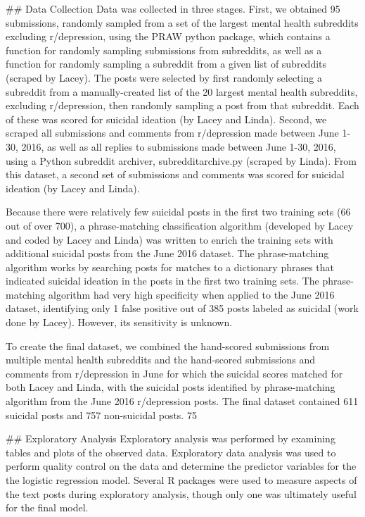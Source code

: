 ## Data Collection
Data was collected in three stages. First, we obtained 95 submissions, randomly sampled from a set of the largest mental health subreddits excluding r/depression, using the PRAW python package, which contains a function for randomly sampling submissions from subreddits, as well as a function for randomly sampling a subreddit from a given list of subreddits (scraped by Lacey). The posts were selected by first randomly selecting a subreddit from a manually-created list of the 20 largest mental health subreddits, excluding r/depression, then randomly sampling a post from that subreddit. Each of these was scored for suicidal ideation (by Lacey and Linda). Second, we scraped all submissions and comments from r/depression made between June 1-30, 2016, as well as all replies to submissions made between June 1-30, 2016, using a Python subreddit archiver, subredditarchive.py (scraped by Linda). From this dataset, a second set of submissions and comments was scored for suicidal ideation (by Lacey and Linda).


Because there were relatively few suicidal posts in the first two training sets (66 out of over 700), a phrase-matching classification algorithm (developed by Lacey and coded by Lacey and Linda) was written to enrich the training sets with additional suicidal posts from the June 2016 dataset. The phrase-matching algorithm works by searching posts for matches to a dictionary phrases that indicated suicidal ideation in the posts in the first two training sets. The phrase-matching algorithm had very high specificity when applied to the June 2016 dataset, identifying only 1 false positive out of 385 posts labeled as suicidal (work done by Lacey). However, its sensitivity is unknown. 


To create the final dataset, we combined the hand-scored submissions from multiple mental health subreddits and the hand-scored submissions and comments from r/depression in June for which the suicidal scores matched for both Lacey and Linda, with the suicidal posts identified by phrase-matching algorithm from the June 2016 r/depression posts. The final dataset contained 611 suicidal posts and 757 non-suicidal posts. 75%


## Exploratory Analysis
Exploratory analysis was performed by examining tables and plots of the observed data. Exploratory data analysis was used to perform quality control on the data and determine the predictor variables for the the logistic regression model. Several R packages were used to measure aspects of the text posts during exploratory analysis, though only one was ultimately useful for the final model. 


